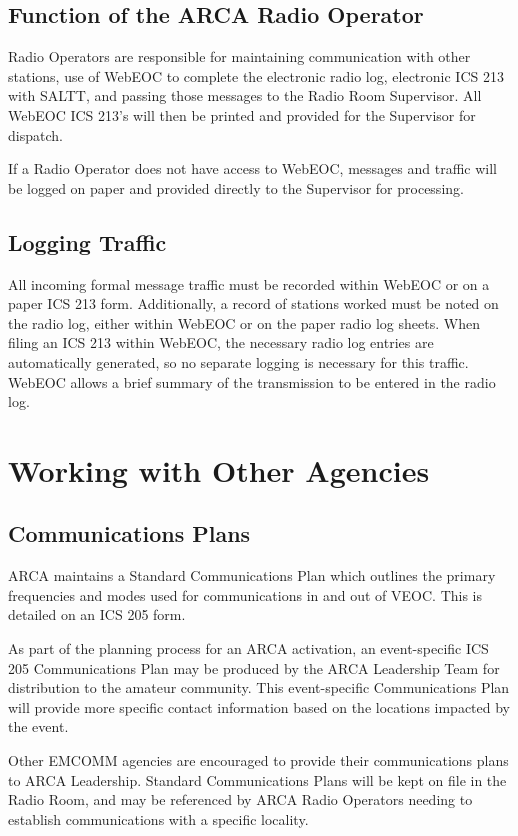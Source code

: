 \documentclass[pdflatex,letterpaper,twoside,12pt]{book}
\begin{document}
\subsection{Function of the ARCA Radio Operator}

Radio Operators are responsible for maintaining communication with other stations, use of WebEOC to complete the electronic radio log, electronic ICS 213 with SALTT, and passing those messages to the Radio Room Supervisor.  All WebEOC ICS 213's will then be printed and provided for the Supervisor for dispatch.

If a Radio Operator does not have access to WebEOC, messages and traffic will be logged on paper and provided directly to the Supervisor for processing.

\subsection{Logging Traffic}

All incoming formal message traffic must be recorded within WebEOC or on a paper ICS 213 form.  Additionally, a record of stations worked must be noted on the radio log, either within WebEOC or on the paper radio log sheets.  When filing an ICS 213 within WebEOC, the necessary radio log entries are automatically generated, so no separate logging is necessary for this traffic.  WebEOC allows a brief summary of the transmission to be entered in the radio log.

\section{Working with Other Agencies}

\subsection{Communications Plans}

ARCA maintains a Standard Communications Plan which outlines the primary frequencies and modes used for communications in and out of VEOC.  This is detailed on an ICS 205 form.

As part of the planning process for an ARCA activation, an event-specific ICS 205 Communications Plan may be produced by the ARCA Leadership Team for distribution to the amateur community.  This event-specific Communications Plan will provide more specific contact information based on the locations impacted by the event.

Other EMCOMM agencies are encouraged to provide their communications plans to ARCA Leadership.  Standard Communications Plans will be kept on file in the Radio Room, and may be referenced by ARCA Radio Operators needing to establish communications with a specific locality.
\end{document}
